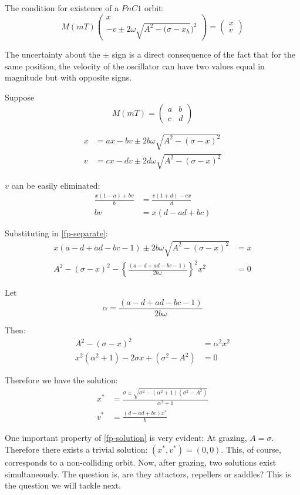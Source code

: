 \documentclass{book}
\renewcommand{\(}{\begin{columns}}
\renewcommand{\)}{\end{columns}}
\newcommand{\<}[1]{\begin{column}{#1}}
\renewcommand{\>}{\end{column}}
\newcommand{\colv}[2]{\begin{pmatrix}#1\\#2\end{pmatrix}}
\begin{document}
The condition for existence of a $PnC1$ orbit:
\begin{equation}
\label{impactmap-final}
M(mT)\colv{x}{-v\pm2\omega \sqrt{A^2-(\sigma-x_h})^2}=\colv{x}{v}
\end{equation}

The uncertainty about the $\pm$  sign is a 
direct consequence of the fact that for the same position, the velocity of the 
oscillator can have two values equal in magnitude but with opposite signs.  

Suppose
\[
M(mT)=
\begin{pmatrix}
a & b\\
c & d
\end{pmatrix}
\]

\begin{align}
\label{fp-separate}
x&=ax-bv \pm 2b\omega\sqrt{A^2-(\sigma-x)^2}\\
v&=cx-dv \pm 2d\omega\sqrt{A^2-(\sigma-x)^2}
\end{align}

$v$ can be easily eliminated:
\begin{align*}
\frac{x(1-a)+bv}{b}&=\frac{v(1+d)-cx}{d}\\
bv&=x(d-ad+bc)
\end{align*}

Substituting in \eqref{fp-separate}:
\begin{align*}
x(a-d+ad-bc-1)\pm 2b\omega\sqrt{A^2-(\sigma-x)^2}&=x\\
A^2-(\sigma-x)^2-\left\{\frac{(a-d+ad-bc-1)}{2b\omega}\right\}^2x^2&=0
\end{align*}


Let \[
\alpha=\frac{(a-d+ad-bc-1)}{2b\omega}
\]

Then:
\begin{align*}
A^2-(\sigma-x)^2&=\alpha^2x^2\\
x^2(\alpha^2+1)-2\sigma x+(\sigma^2-A^2)&=0
\end{align*}

Therefore we have the solution:
\begin{align}
\label{fp-solution}
x^*&=\frac{\sigma\pm\sqrt{\sigma^2-(\alpha^2+1)(\sigma^2-A^2)}}{\alpha^2+1}\\
v^*&=\frac{(d-ad+bc)x^*}{b}
\end{align}


One important property of  \eqref{fp-solution} is very evident:
At grazing, $A=\sigma$.  Therefore there exists a trivial solution: 
$(x^*,v^*)=(0,0)$.  This, of course, corresponds to a non-colliding orbit.  
Now, after grazing, two solutions exist simultaneously.  The question is, 
are they attactors, repellers or saddles? This is the question we will tackle 
next.  
\end{document}

